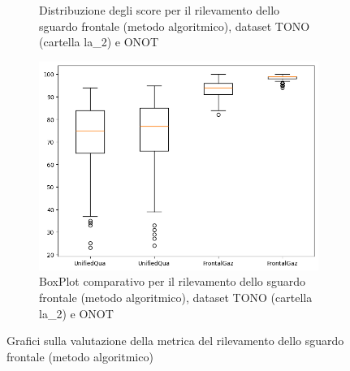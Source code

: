 \documentclass[12pt,a4paper,openright,twoside]{book}
\begin{document}
\begin{figure}[htbp]
\begin{subfigure}{0.49\textwidth}
        \caption{Distribuzione degli score per il rilevamento dello sguardo frontale (metodo algoritmico), dataset TONO (cartella la\_2) e ONOT}
        \label{fig:score_distribution_tono_onot_l2_frontal_gaze_algo}
    \end{subfigure}
    \hfill
    \begin{subfigure}{0.49\textwidth}
        \centering
        \includegraphics[width=.7\linewidth]{figures/box-plot-tono-onot-l2-frontal-gaze-algo.png}
        \caption{BoxPlot comparativo per il rilevamento dello sguardo frontale (metodo algoritmico), dataset TONO (cartella la\_2) e ONOT}
        \label{fig:box_plot_tono_onot_l2_frontal_gaze_algo}
    \end{subfigure}

    \caption{Grafici sulla valutazione della metrica del rilevamento dello sguardo frontale (metodo algoritmico)}
\end{figure}
\end{document}
